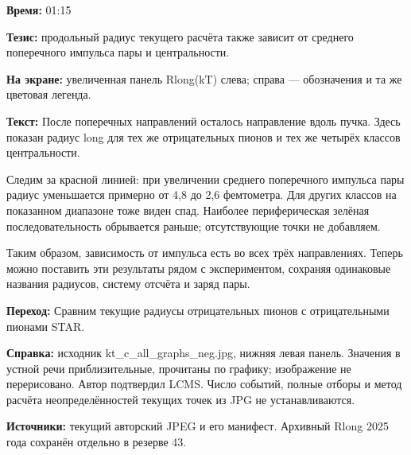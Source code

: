 \textbf{Время:} 01:15

\textbf{Тезис:} продольный радиус текущего расчёта также зависит от среднего поперечного импульса пары и центральности.

\textbf{На экране:} увеличенная панель Rlong(kT) слева; справа — обозначения и та же цветовая легенда.

\textbf{Текст:} После поперечных направлений осталось направление вдоль пучка. Здесь показан радиус long для тех же отрицательных пионов и тех же четырёх классов центральности.

Следим за красной линией: при увеличении среднего поперечного импульса пары радиус уменьшается примерно от 4,8 до 2,6 фемтометра. Для других классов на показанном диапазоне тоже виден спад. Наиболее периферическая зелёная последовательность обрывается раньше; отсутствующие точки не добавляем.

Таким образом, зависимость от импульса есть во всех трёх направлениях. Теперь можно поставить эти результаты рядом с экспериментом, сохраняя одинаковые названия радиусов, систему отсчёта и заряд пары.

\textbf{Переход:} Сравним текущие радиусы отрицательных пионов с отрицательными пионами STAR.

\textbf{Справка:} исходник kt\_c\_all\_graphs\_neg.jpg, нижняя левая панель. Значения в устной речи приблизительные, прочитаны по графику; изображение не перерисовано. Автор подтвердил LCMS. Число событий, полные отборы и метод расчёта неопределённостей текущих точек из JPG не устанавливаются.

\textbf{Источники:} текущий авторский JPEG и его манифест. Архивный Rlong 2025 года сохранён отдельно в резерве 43.
